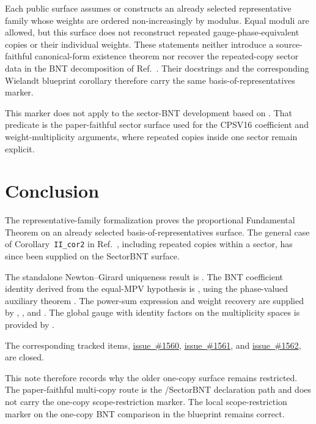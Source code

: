\documentclass{article}
\begin{document}
Each public surface assumes or constructs an already selected representative
family whose weights are ordered non-increasingly by modulus. Equal moduli are
allowed, but this surface does not reconstruct repeated
gauge-phase-equivalent copies or their individual weights. These statements
neither introduce a source-faithful canonical-form existence theorem nor
recover the repeated-copy sector data in the BNT decomposition of
Ref.~\cite{Cirac2016MPDO_arXiv}. Their docstrings and the corresponding
Wielandt blueprint corollary therefore carry the same
basis-of-representatives marker.

This marker does not apply to the sector-BNT development based on
. That predicate is the paper-faithful sector
surface used for the CPSV16 coefficient and weight-multiplicity arguments,
where repeated copies inside one sector remain explicit.

\section{Conclusion}

The representative-family formalization proves the proportional Fundamental
Theorem on an already selected basis-of-representatives surface. The general
case of Corollary~\texttt{II\_cor2} in
Ref.~\cite{Cirac2016MPDO_arXiv}, including repeated copies within a sector,
has since been supplied on the SectorBNT surface.

The standalone Newton--Girard uniqueness result is
.
The BNT coefficient identity derived from the equal-MPV hypothesis is
, using the phase-valued
auxiliary theorem
. The power-sum
expression and weight recovery are supplied by
,
, and
. The global gauge with identity
factors on the multiplicity spaces is provided by
.

The corresponding tracked items,
\href{https://github.com/LionSR/TNLean/issues/1560}{issue~\#1560},
\href{https://github.com/LionSR/TNLean/issues/1561}{issue~\#1561}, and
\href{https://github.com/LionSR/TNLean/issues/1562}{issue~\#1562}, are closed.

This note therefore records why the older one-copy surface remains restricted.
The paper-faithful multi-copy route is the
/SectorBNT declaration path and does not
carry the one-copy scope-restriction marker. The local scope-restriction marker
on the one-copy BNT comparison in the blueprint remains correct.



\end{document}
